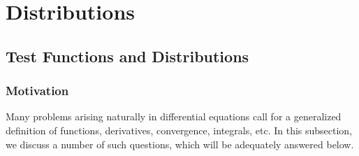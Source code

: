\section{Distributions}\label{chap:distributions}\label{chap:fourier-transform}

\subsection{Test Functions and Distributions}\label{sec:test-functions-distributions}

\subsubsection{Motivation}\label{subsec:distributions-motivation}

Many problems arising naturally in differential equations call for a generalized definition of functions, derivatives, convergence, integrals, etc. In this subsection, we discuss a number of such questions, which will be adequately answered below.

